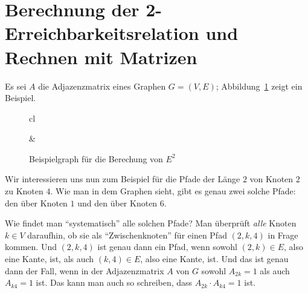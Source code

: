 \Tut\section{Berechnung der 2-Erreichbarkeitsrelation und Rechnen mit Matrizen}
\label{sec:e-quadrat}

Es sei $A$ die Adjazenzmatrix eines Graphen $G=(V,E)$;
Abbildung~\ref{fig:e-quadrat} zeigt ein Beispiel.
%
\begin{figure}[htb]
  \centering
  \begin{tabular}{cl}
    &
  \end{tabular}
  \caption{Beispielgraph für die Berechung von $E^2$}
  \label{fig:e-quadrat}
\end{figure}
%
Wir interessieren uns nun zum Beispiel für die Pfade der Länge $2$ von
Knoten $2$ zu Knoten $4$. Wie man in dem Graphen sieht, gibt es genau
zwei solche Pfade: den über Knoten $1$ und den über Knoten $6$. 

Wie findet man "`systematisch"' alle solchen Pfade? Man überprüft
\emph{alle} Knoten $k\in V$ daraufhin, ob sie als "`Zwischenknoten"'
für einen Pfad $(2,k,4)$ in Frage kommen. Und $(2,k,4)$ ist genau dann
ein Pfad, wenn sowohl $(2,k)\in E$, also eine Kante, ist, als auch
$(k,4)\in E$, also eine Kante, ist. Und das ist genau dann der Fall,
wenn in der Adjazenzmatrix $A$ von $G$ sowohl $A_{2k}=1$ als auch
$A_{k4}=1$ ist. Das kann man auch so schreiben, dass $A_{2k}\cdot
A_{k4}=1$ ist.

